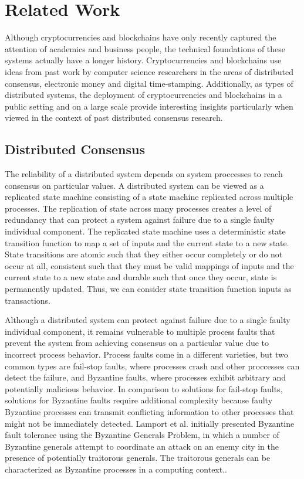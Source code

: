 \section{Related Work}
\label{sec:related}

Although cryptocurrencies and blockchains have only recently captured the attention of academics and
business people, the technical foundations of these systems actually have a longer
history. Cryptocurrencies and blockchains use ideas from past work by computer science
researchers in the areas of distributed consensus, electronic money
and digital time-stamping. Additionally, as types of distributed systems, the
deployment of cryptocurrencies and blockchains in a public
setting and on a large scale provide interesting insights particularly when viewed in the
context of past distributed consensus research.

\subsection{Distributed Consensus}

The reliability of a distributed system depends on system proccesses to
reach consensus on particular values. A distributed system can be viewed as a
replicated state machine consisting of a state machine replicated across
multiple processes. The replication of state across many processes creates a level of redundancy that
can protect a system against failure due to a single faulty individual component. The
replicated state machine uses a deterministic state transition function to map a set
of inputs and the current state to a new state\cite{faulttolerant}. State
transitions are atomic such that they either occur completely or do not occur at
all, consistent such that they must be valid mappings of inputs and the current
state to a new state and durable such that once they occur, state is permanently
updated. Thus, we can consider state transition function inputs as transactions\cite{transactions}.

Although a distributed system can protect against failure due to a single faulty
individual component, it remains vulnerable to multiple process faults that
prevent the system from achieving consensus on a particular value due to
incorrect process behavior. Process faults come in a different varieties, but
two common types are fail-stop faults, where processes crash and other proccesses can detect the failure, and
Byzantine faults, where processes exhibit arbitrary and potentially
malicious behavior\cite{faulttolerant}. In comparison to solutions for fail-stop
faults, solutions for Byzantine faults require additional complexity because
faulty Byzantine processes can transmit conflicting information to other processes that might
not be immediately detected. Lamport et al. initially presented Byzantine fault
tolerance using the Byzantine Generals Problem, in which a number of Byzantine
generals attempt to coordinate an attack on an enemy city in the presence of
potentially traitorous generals. The traitorous generals can be characterized as
Byzantine processes in a computing context.\cite{byzantine}.

